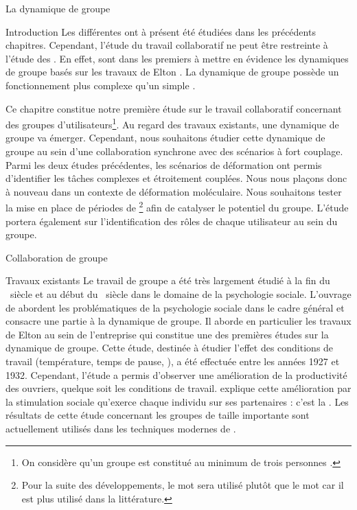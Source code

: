 \documentclass[myfrancais]{mythesis}
\begin{document}
	\begin{mychapter}{La dynamique de groupe}
		\begin{mysection}{Introduction}
			Les différentes  ont à présent été étudiées dans les précédents chapitres.
			Cependant, l'étude du travail collaboratif ne peut être restreinte à l'étude des .
			En effet,  sont dans les premiers à mettre en évidence les dynamiques de groupe basés sur les travaux de Elton .
			La dynamique de groupe possède un fonctionnement plus complexe qu'un simple .

			Ce chapitre constitue notre première étude sur le travail collaboratif concernant des groupes d'utilisateurs\footnote{On considère qu'un groupe est constitué au minimum de trois personnes .}.
			Au regard des travaux existants, une dynamique de groupe va émerger.
			Cependant, nous souhaitons étudier cette dynamique de groupe au sein d'une collaboration synchrone avec des scénarios à fort couplage.
			Parmi les deux études précédentes, les scénarios de déformation ont permis d'identifier les tâches complexes et étroitement couplées.
			Nous nous plaçons donc à nouveau dans un contexte de déformation moléculaire.
			Nous souhaitons tester la mise en place de périodes de \mybrainstorming\footnote{Pour la suite des développements, le mot \mybrainstorming sera utilisé plutôt que le mot  car il est plus utilisé dans la littérature.} afin de catalyser le potentiel du groupe.
			L'étude portera également sur l'identification des rôles de chaque utilisateur au sein du groupe.
		\end{mysection}
		\begin{mysection}{Collaboration de groupe}
			\begin{mysubsection}{Travaux existants}
				Le travail de groupe a été très largement étudié à la fin du ~siècle et au début du ~siècle dans le domaine de la psychologie sociale.
				L'ouvrage de  abordent les problématiques de la psychologie sociale dans le cadre général et consacre une partie à la dynamique de groupe.
				Il aborde en particulier les travaux de Elton  au sein de l'entreprise \myHawthorne qui constitue une des premières études sur la dynamique de groupe.
				Cette étude, destinée à étudier l'effet des conditions de travail (température, temps de pause, \myetc), a été effectuée entre les années 1927 et 1932.
				Cependant, l'étude a permis d'observer une amélioration de la productivité des ouvriers, quelque soit les conditions de travail.
				 explique cette amélioration par la stimulation sociale qu'exerce chaque individu sur ses partenaires : c'est la .
				Les résultats de cette étude concernant les groupes de taille importante sont actuellement utilisés dans les techniques modernes de  .


\end{mysubsection}
\end{mysection}
\end{mychapter}
\end{document}
